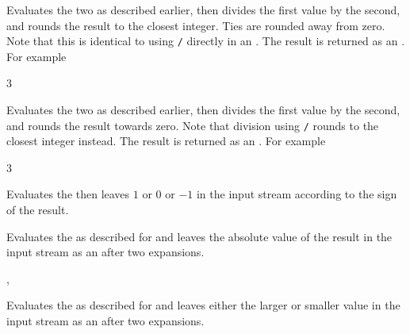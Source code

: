 \documentclass[oneside]{book}
\begin{document}
\begin{function}{\intMathDiv}
\begin{syntax}
  
\end{syntax}
Evaluates the two  as described earlier,
then divides the first value by the second, and rounds the result
to the closest integer. Ties are rounded away from zero. Note that
this is identical to using \verb|/| directly in an .
The result is returned as an .
For example
\begin{demohigh}
 {3}
\end{demohigh}
\end{function}

\begin{function}{\intMathDivTrancate}
\begin{syntax}
  
\end{syntax}
Evaluates the two  as described earlier,
then divides the first value by the second, and rounds the result towards zero.
Note that division using \verb|/| rounds to the closest integer instead.
The result is returned as an .
For example
\begin{demohigh}
 {3}
\end{demohigh}
\end{function}

\begin{function}{\intMathSign}
\begin{syntax}
 
\end{syntax}
Evaluates the  then leaves $1$ or $0$ or
$-1$ in the input stream according to the sign of the result.
\end{function}

\begin{function}{\intMathAbs}
\begin{syntax}
 
\end{syntax}
Evaluates the  as described for
 and leaves the absolute value of the result in
the input stream as an  after two
expansions.
\end{function}

\begin{function}{\intMathMax,\intMathMin}
\begin{syntax}
  
  
\end{syntax}
Evaluates the  as described for
 and leaves either the larger or smaller value
in the input stream as an  after two
expansions.
\end{function}
\end{document}

